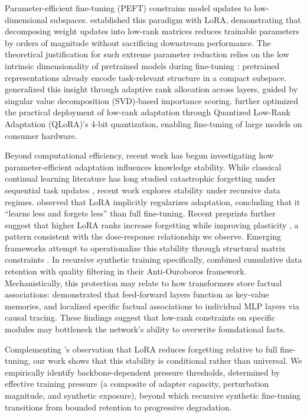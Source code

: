 \documentclass[a4paper,fleqn]{cas-dc}
\newif\ifshowchanges
\newcommand{\rev}[1]{\ifshowchanges{\color{blue}#1}\else{#1}\fi}
\begin{document}
Parameter-efficient fine-tuning (PEFT) constrains model updates to
low-dimensional subspaces. \citet{hu2022} established this paradigm with LoRA,
demonstrating that decomposing weight updates into low-rank matrices reduces
trainable parameters by orders of magnitude without sacrificing downstream
performance. The theoretical justification for such extreme parameter reduction
relies on the low intrinsic dimensionality of pretrained models during
fine-tuning \citep{aghajanyan2021}: pretrained representations already encode
task-relevant structure in a compact subspace. \citet{zhang2023adalora}
generalized this insight through adaptive rank allocation across layers, guided
by \rev{singular value decomposition (SVD)}-based importance scoring. \citet{dettmers2023} further optimized the
practical deployment of low-rank adaptation through \rev{Quantized Low-Rank Adaptation (QLoRA)}'s 4-bit quantization,
enabling fine-tuning of large models on consumer hardware.

Beyond computational efficiency, recent work has begun investigating how
parameter-efficient adaptation influences knowledge stability. While classical
continual learning literature has long studied catastrophic forgetting under
sequential task updates \citep{kirkpatrick2017,delange2022,shi2024continualllm}, recent work
explores stability under recursive data regimes. \citet{biderman2024} observed
that LoRA implicitly regularizes adaptation, concluding that it ``learns less
and forgets less'' than full fine-tuning. Recent preprints further suggest that
higher LoRA ranks increase forgetting while improving plasticity
\citep{biderman2024incremental,ding2024ranktrade},
a pattern consistent with the dose-response relationship we observe. Emerging
frameworks attempt to operationalize this stability through structural matrix
constraints \citep{fawi2024curlora}. In
recursive synthetic training specifically, \citet{adapala2025} combined
cumulative data retention with quality filtering in their Anti-Ouroboros
framework. Mechanistically, this protection may relate to how transformers
store factual associations: \citet{geva2021} demonstrated that feed-forward
layers function as key-value memories, and \citet{meng2022locating} localized
specific factual associations to individual MLP layers via causal tracing. These
findings suggest that low-rank constraints on specific modules may bottleneck
the network's ability to overwrite foundational facts.

Complementing \citet{biderman2024}'s observation that LoRA reduces forgetting
relative to full fine-tuning, our work shows that this stability is conditional
rather than universal. We empirically identify backbone-dependent pressure
thresholds, determined by effective training pressure (a composite of adapter
capacity, perturbation magnitude, and synthetic exposure), beyond which
recursive synthetic fine-tuning transitions from bounded retention to
progressive degradation.
\end{document}
